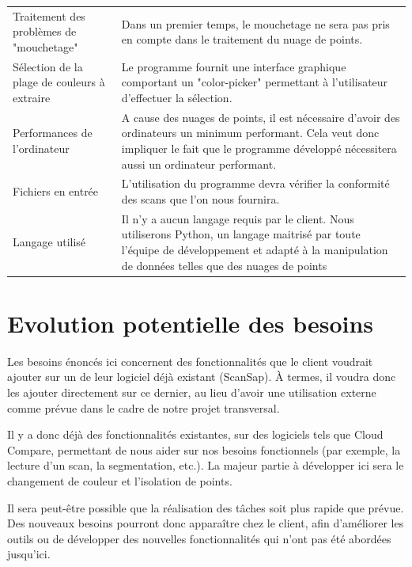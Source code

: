 \documentclass[12pt,titlepage,french]{article}
\begin{document}
\noindent\begin{tabu} to \textwidth {X[c]X[c3]}\toprule
{}&\\\toprule
Traitement des problèmes de "mouchetage"
& Dans un premier temps, le mouchetage ne sera pas pris en compte dans le traitement du nuage de points.
\\\midrule
Sélection de la plage de couleurs à extraire 
& Le programme fournit une interface graphique comportant un "color-picker" permettant à l'utilisateur d'effectuer la sélection.\\\midrule
Performances de l'ordinateur
& A cause des nuages de points, il est nécessaire d'avoir des ordinateurs un minimum performant. Cela veut donc impliquer le fait que le programme développé nécessitera aussi un ordinateur performant.\\\midrule
Fichiers en entrée
& L'utilisation du programme devra vérifier la conformité des scans que l'on nous fournira.\\\midrule
Langage utilisé
& Il n'y a aucun langage requis par le client. Nous utiliserons Python, un langage maitrisé par toute l'équipe de développement et adapté à la manipulation de données telles que des nuages de points\\\bottomrule
\end{tabu}

\section{Evolution potentielle des besoins}

Les besoins énoncés ici concernent des fonctionnalités que le client voudrait ajouter sur un de leur logiciel déjà existant (ScanSap). À termes, il voudra donc les ajouter directement sur ce dernier, au lieu d'avoir une utilisation externe comme prévue dans le cadre de notre projet transversal.

Il y a donc déjà des fonctionnalités existantes, sur des logiciels tels que Cloud Compare, permettant de nous aider sur nos besoins fonctionnels (par exemple, la lecture d'un scan, la segmentation, etc.). La majeur partie à développer ici sera le changement de couleur et l'isolation de points.

Il sera peut-être possible que la réalisation des tâches soit plus rapide que prévue. Des nouveaux besoins pourront donc apparaître chez le client, afin d'améliorer les outils ou de développer des nouvelles fonctionnalités qui n'ont pas été abordées jusqu'ici.
\end{document}
